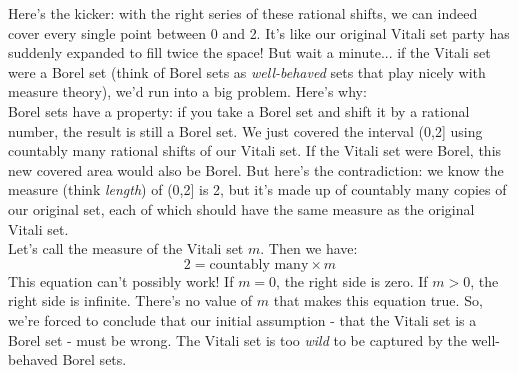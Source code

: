 Here's the kicker: with the right series of these rational shifts, we can indeed cover every single point between 0 and 2. It's like our original Vitali set party has suddenly expanded to fill twice the space! But wait a minute... if the Vitali set were a Borel set (think of Borel sets as \textit{well-behaved} sets that play nicely with measure theory), we'd run into a big problem. Here's why:\\

Borel sets have a property: if you take a Borel set and shift it by a rational number, the result is still a Borel set. We just covered the interval (0,2] using countably many rational shifts of our Vitali set.
If the Vitali set were Borel, this new covered area would also be Borel. But here's the contradiction: we know the measure (think \textit{length}) of (0,2] is 2, but it's made up of countably many copies of our original set, each of which should have the same measure as the original Vitali set.\\

Let's call the measure of the Vitali set $m$. Then we have:
\[
2 = \text{countably many} \times m
\]
This equation can't possibly work! If $m = 0$, the right side is zero. If $m > 0$, the right side is infinite. There's no value of $m$ that makes this equation true. So, we're forced to conclude that our initial assumption - that the Vitali set is a Borel set - must be wrong. The Vitali set is too \textit{wild} to be captured by the well-behaved Borel sets.
